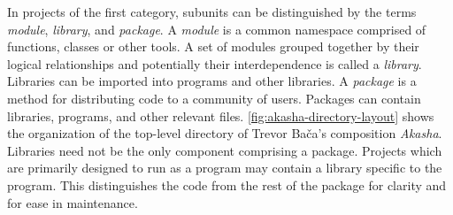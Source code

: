 In projects of the first category, subunits can be distinguished by the terms \textit{module}, \textit{library}, and \textit{package}. A \textit{module} is a common namespace comprised of functions, classes or other tools. A set of modules grouped together by their logical relationships and potentially their interdependence is called a \textit{library}. Libraries can be imported into programs and other libraries. A \textit{package} is a method for distributing code to a community of users. Packages can contain libraries, programs, and other relevant files. \autoref{fig:akasha-directory-layout} shows the organization of the top-level directory of Trevor Ba\v{c}a's composition \textit{Akasha}. Libraries need not be the only component comprising a package. Projects which are primarily designed to run as a program may contain a library specific to the program. This distinguishes the code from the rest of the package for clarity and for ease in maintenance.
\\

